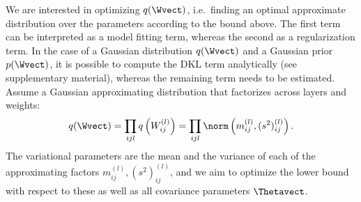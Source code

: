 We are interested in optimizing $q(\Wvect)$, i.e.\ finding an optimal approximate distribution over the parameters according to the bound above.
The first term can be interpreted as a model fitting term, whereas the second as a regularization term.
In the case of a Gaussian distribution $q(\Wvect)$ and a Gaussian prior $p(\Wvect)$, it is possible to compute the DKL term analytically (see supplementary material), whereas the remaining term needs to be estimated.
Assume a Gaussian approximating distribution that factorizes across layers and weights:
\begin{equation}
q(\Wvect) = \prod_{ijl} q\left(W^{(l)}_{ij}\right) = \prod_{ijl} \norm\left(m^{(l)}_{ij}, (s^2)^{(l)}_{ij} \right) \text{.}
\end{equation}
The variational parameters are the mean and the variance of each of the approximating factors $m^{(l)}_{ij}, (s^2)^{(l)}_{ij}$,
and we aim to optimize the lower bound with respect to these as well as all covariance parameters $\Thetavect$.

